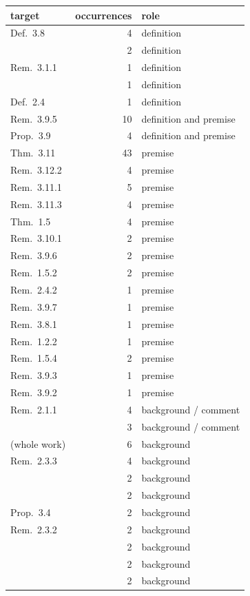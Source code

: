 \documentclass[11pt]{article}
\theoremstyle{plain}
\theoremstyle{definition}
\theoremstyle{remark}
\begin{document}
\begin{longtable}{lrl}
\toprule
target & occurrences & role\\
\midrule
\endhead
Def.~3.8 & 4 & definition \\
\cite[Cor.~4.10]{IUT2} & 2 & definition \\
Rem.~3.1.1 & 1 & definition \\
\cite[Def.~3.1]{IUT1} & 1 & definition \\
Def.~2.4 & 1 & definition \\
Rem.~3.9.5 & 10 & definition and premise \\
Prop.~3.9 & 4 & definition and premise \\
Thm.~3.11 & 43 & premise \\
Rem.~3.12.2 & 4 & premise \\
Rem.~3.11.1 & 5 & premise \\
Rem.~3.11.3 & 4 & premise \\
Thm.~1.5 & 4 & premise \\
Rem.~3.10.1 & 2 & premise \\
Rem.~3.9.6 & 2 & premise \\
Rem.~1.5.2 & 2 & premise \\
Rem.~2.4.2 & 1 & premise \\
Rem.~3.9.7 & 1 & premise \\
Rem.~3.8.1 & 1 & premise \\
Rem.~1.2.2 & 1 & premise \\
Rem.~1.5.4 & 2 & premise \\
Rem.~3.9.3 & 1 & premise \\
Rem.~3.9.2 & 1 & premise \\
Rem.~2.1.1 & 4 & background / comment \\
\cite[Rem.~3.6.4]{IUT2} & 3 & background / comment \\
\cite{EtTh} (whole work) & 6 & background \\
Rem.~2.3.3 & 4 & background \\
\cite[Ex.~5.1]{IUT1} & 2 & background \\
\cite[Def.~5.2]{IUT1} & 2 & background \\
Prop.~3.4 & 2 & background \\
Rem.~2.3.2 & 2 & background \\
\cite[Rem.~4.11.2]{IUT2} & 2 & background \\
\cite[\S 3]{IUT2} & 2 & background \\
\cite[Cor.~3.5]{IUT2} & 2 & background \\

\end{longtable}
\end{document}
